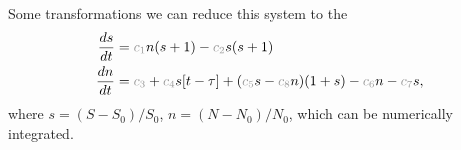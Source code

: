 \newcommand{\grey}[1]{\textcolor{mygray}{#1}}

Some transformations we can reduce this system to the 
\begin{align*}
    \frac{d s}{d t} &= \grey{c_1} n (s+1) - \grey{c_2} s (s+1) \\
    \frac{d n}{d t} &= \grey{c_3} + \grey{c_4}  s[t-\tau] + (\grey{c_5} s -\grey{c_8} n) (1+s) - \grey{c_6} n - \grey{c_7} s ,
\end{align*}
where $s = (S-S_0)/S_0$, $n = (N-N_0)/N_0$, which can be numerically integrated.